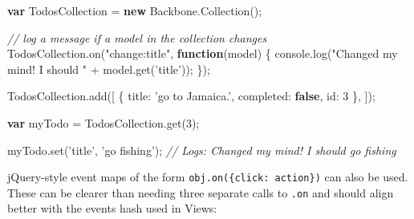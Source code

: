 \documentclass[9pt]{book}
\newenvironment{Shaded}{}{}
\newcommand{\KeywordTok}[1]{\textcolor[rgb]{0.00,0.44,0.13}{\textbf{{#1}}}}
\newcommand{\DataTypeTok}[1]{\textcolor[rgb]{0.56,0.13,0.00}{{#1}}}
\newcommand{\DecValTok}[1]{\textcolor[rgb]{0.25,0.63,0.44}{{#1}}}
\newcommand{\StringTok}[1]{\textcolor[rgb]{0.25,0.44,0.63}{{#1}}}
\newcommand{\CommentTok}[1]{\textcolor[rgb]{0.38,0.63,0.69}{\textit{{#1}}}}
\newcommand{\OtherTok}[1]{\textcolor[rgb]{0.00,0.44,0.13}{{#1}}}
\newcommand{\FunctionTok}[1]{\textcolor[rgb]{0.02,0.16,0.49}{{#1}}}
\newcommand{\NormalTok}[1]{{#1}}
\begin{document}
\begin{Shaded}
\begin{Highlighting}[]
\KeywordTok{var} \NormalTok{TodosCollection = }\KeywordTok{new} \OtherTok{Backbone}\NormalTok{.}\FunctionTok{Collection}\NormalTok{();}

\CommentTok{// log a message if a model in the collection changes}
\OtherTok{TodosCollection}\NormalTok{.}\FunctionTok{on}\NormalTok{(}\StringTok{"change:title"}\NormalTok{, }\KeywordTok{function}\NormalTok{(model) \{}
    \OtherTok{console}\NormalTok{.}\FunctionTok{log}\NormalTok{(}\StringTok{"Changed my mind! I should "} \NormalTok{+ }\OtherTok{model}\NormalTok{.}\FunctionTok{get}\NormalTok{(}\StringTok{'title'}\NormalTok{));}
\NormalTok{\});}

\OtherTok{TodosCollection}\NormalTok{.}\FunctionTok{add}\NormalTok{([}
  \NormalTok{\{ }\DataTypeTok{title}\NormalTok{: }\StringTok{'go to Jamaica.'}\NormalTok{, }\DataTypeTok{completed}\NormalTok{: }\KeywordTok{false}\NormalTok{, }\DataTypeTok{id}\NormalTok{: }\DecValTok{3} \NormalTok{\},}
\NormalTok{]);}

\KeywordTok{var} \NormalTok{myTodo = }\OtherTok{TodosCollection}\NormalTok{.}\FunctionTok{get}\NormalTok{(}\DecValTok{3}\NormalTok{);}

\OtherTok{myTodo}\NormalTok{.}\FunctionTok{set}\NormalTok{(}\StringTok{'title'}\NormalTok{, }\StringTok{'go fishing'}\NormalTok{);}
\CommentTok{// Logs: Changed my mind! I should go fishing}
\end{Highlighting}
\end{Shaded}

jQuery-style event maps of the form \texttt{obj.on(\{click: action\})}
can also be used. These can be clearer than needing three separate calls
to \texttt{.on} and should align better with the events hash used in
Views:
\end{document}
